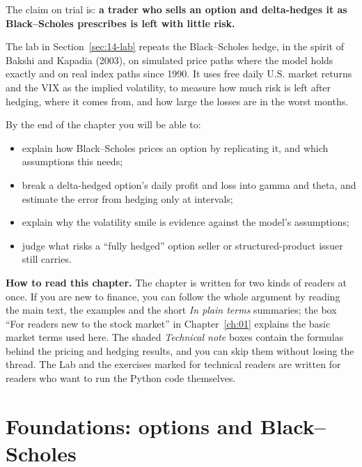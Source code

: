 The claim on trial is: \textbf{a trader who sells an option and delta-hedges it as Black--Scholes prescribes is left with little risk.}

The lab in Section~\ref{sec:14-lab} repeats the Black--Scholes hedge, in the spirit of Bakshi and Kapadia (2003), on simulated price paths where the model holds exactly and on real index paths since 1990. It uses free daily U.S. market returns and the VIX as the implied volatility, to measure how much risk is left after hedging, where it comes from, and how large the losses are in the worst months.

By the end of the chapter you will be able to:

\begin{itemize}
  \item explain how Black--Scholes prices an option by replicating it, and which assumptions this needs;
  \item break a delta-hedged option's daily profit and loss into gamma and theta, and estimate the error from hedging only at intervals;
  \item explain why the volatility smile is evidence against the model's assumptions;
  \item judge what risks a ``fully hedged'' option seller or structured-product issuer still carries.
\end{itemize}

\begin{callout}
\textbf{How to read this chapter.} The chapter is written for two kinds of readers at once. If you are new to finance, you can follow the whole argument by reading the main text, the examples and the short \emph{In plain terms} summaries; the box ``For readers new to the stock market'' in Chapter~\ref{ch:01} explains the basic market terms used here. The shaded \emph{Technical note} boxes contain the formulas behind the pricing and hedging results, and you can skip them without losing the thread. The Lab and the exercises marked for technical readers are written for readers who want to run the Python code themselves.
\end{callout}

\section{Foundations: options and Black--Scholes}
\label{sec:14-foundations}

